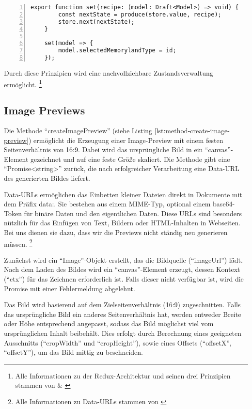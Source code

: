 \begin{lstlisting}[numbers=left,caption={State ist unveränderlich Implementierung in Memoryland},label={lst:state-management}]
    export function set(recipe: (model: Draft<Model>) => void) {
        const nextState = produce(store.value, recipe);
        store.next(nextState);
    }

    set(model => {
        model.selectedMemorylandType = id;
    });
\end{lstlisting}

Durch diese Prinzipien wird eine nachvollziehbare Zustandsverwaltung ermöglicht.
\footnote{Alle Informationen zu der Redux-Architektur und seinen drei Prinzipien stammen von \cite{DAR} \& \cite{DARa}}

\subsection{Image Previews}
Die Methode ``createImagePreview'' (siehe Listing \ref{lst:method-create-image-preview}) ermöglicht die Erzeugung 
einer Image-Preview mit einem festen Seitenverhältnis von 16:9. Dabei wird das ursprüngliche Bild in ein 
``canvas''-Element gezeichnet und auf eine feste Größe skaliert. Die Methode gibt eine ``Promise<string>'' zurück, 
die nach erfolgreicher Verarbeitung eine Data-URL des generierten Bildes liefert.

Data-URLs ermöglichen das Einbetten kleiner Dateien direkt in Dokumente mit dem Präfix data:. Sie bestehen 
aus einem MIME-Typ, optional einem base64-Token für binäre Daten und den eigentlichen Daten. Diese URLs sind 
besonders nützlich für das Einfügen von Text, Bildern oder HTML-Inhalten in Webseiten. Bei uns dienen sie dazu,
dass wir die Previews nicht ständig neu generieren müssen. 
\footnote{Alle Informationen zu Data-URLs stammen von \cite{MozillaFoundationa}}

Zunächst wird ein ``Image''-Objekt erstellt, das die Bildquelle (``imageUrl'') lädt. Nach dem Laden des Bildes wird ein 
``canvas''-Element erzeugt, dessen Kontext (``ctx'') für das Zeichnen erforderlich ist. Falls dieser nicht verfügbar 
ist, wird die Promise mit einer Fehlermeldung abgelehnt.

Das Bild wird basierend auf dem Zielseitenverhältnis (16:9) zugeschnitten. Falls das ursprüngliche Bild ein anderes 
Seitenverhältnis hat, werden entweder Breite oder Höhe entsprechend angepasst, sodass das Bild möglichst viel vom 
ursprünglichen Inhalt beibehält. Dies erfolgt durch Berechnung eines geeigneten Ausschnitts (``cropWidth'' und ``cropHeight''), 
sowie eines Offsets (``offsetX'', ``offsetY''), um das Bild mittig zu beschneiden.

